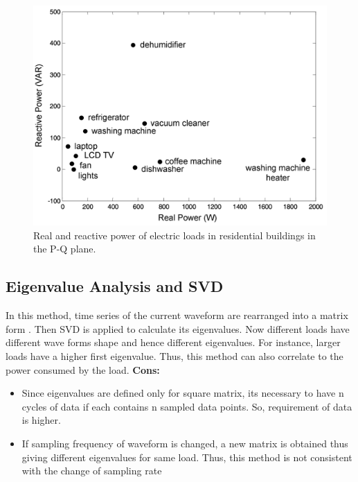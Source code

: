 \documentclass[11pt, a4paper]{article} %
\begin{document}
\begin{figure}[htpb!] %
    \centering %
    \includegraphics[scale=0.6]{figure/realvsreactfig.png} %
    \caption{Real and reactive power of electric loads in residential buildings in the P-Q plane.\cite{192069}} %
    \label{fig:my_label} %
\end{figure}
\subsection{Eigenvalue Analysis and SVD}
In this method, time series of the current waveform are rearranged into a matrix form \cite{lam2005building}. Then SVD is applied to calculate its eigenvalues. Now different loads have different wave forms shape and hence different eigenvalues. For instance, larger loads have a higher first eigenvalue. Thus, this method can also correlate to the power consumed by the load.
\newline
\textbf{Cons:}
\begin{itemize}
    \item Since eigenvalues are defined only for square matrix, its necessary to have n cycles of data if each contains n sampled data points. So, requirement of data is higher.
    \item If sampling frequency of waveform is changed, a new matrix is obtained thus giving different eigenvalues for same load. Thus, this method is not consistent with the change of sampling rate 
\end{itemize}
\end{document}
